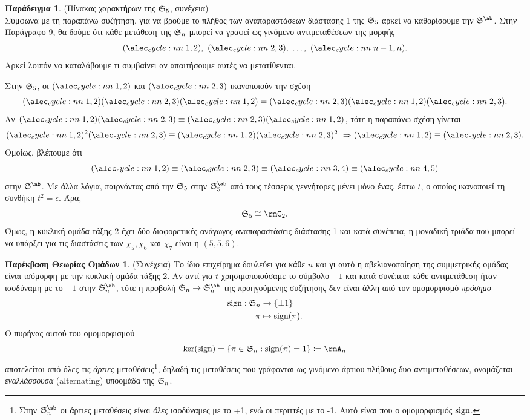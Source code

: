\documentclass[12pt,a4paper,reqno]{amsart}
\theoremstyle{definition}
\newtheorem*{example}{Παράδειγμα}
\newtheorem*{gp_theory}{Παρέκβαση Θεωρίας Ομάδων}
\begin{document}
\begin{example}{\rm(Πίνακας χαρακτήρων της $\mathfrak{S}_5$, συνέχεια)} \\
    Σύμφωνα με τη παραπάνω συζήτηση, για να βρούμε το πλήθος των αναπαραστάσεων διάστασης 1 της $\mathfrak{S}_5$ αρκεί να καθορίσουμε την $\fS^{\ab}$. Στην Παράγραφο 9, θα δούμε ότι κάθε μετάθεση της $\mathfrak{S}_n$ μπορεί να γραφεί ως γινόμενο αντιμεταθέσεων της μορφής 
    \[
    \cycle{1,2}, \ \cycle{2,3}, \ \dots, \ \cycle{n-1,n}.
    \]
    Αρκεί λοιπόν να καταλάβουμε τι συμβαίνει αν απαιτήσουμε αυτές να μετατίθενται. 
    
    Στην $\mathfrak{S}_5$, οι $\cycle{1,2}$ και $\cycle{2,3}$ ικανοποιούν την σχέση
    \[
    \cycle{1,2}\cycle{2,3}\cycle{1,2} = \cycle{2,3}\cycle{1,2}\cycle{2,3}.
    \]
    Αν $\cycle{1,2}\cycle{2,3} \equiv \cycle{2,3}\cycle{1,2}$, τότε η παραπάνω σχέση γίνεται 
    \[
    \cycle{1,2}^2\cycle{2,3} \equiv \cycle{1,2}\cycle{2,3}^2 \ \then \cycle{1,2} \equiv \cycle{2,3}.
    \]
    Ομοίως, βλέπουμε ότι 
    \[
    \cycle{1,2} \equiv \cycle{2,3} \equiv \cycle{3,4} \equiv \cycle{4,5}
    \]
    στην $\fS^\ab$. Με άλλα λόγια, παιρνόντας από την  $\mathfrak{S}_5$ στην $\fS_5^\ab$ από τους τέσσερις γεννήτορες μένει μόνο ένας, έστω $t$, ο οποίος ικανοποιεί τη συνθήκη $t^2 = \epsilon$. Άρα, 
    \[
    \fS_5 \cong \rmC_2.
    \]
    Όμως, η κυκλική ομάδα τάξης 2 έχει δύο διαφορετικές ανάγωγες αναπαραστάσεις διάστασης 1 και κατά συνέπεια, η μοναδική τριάδα που μπορεί να υπάρξει για τις διαστάσεις των $\chi_5, \chi_6$ και $\chi_7$ είναι η $(5,5,6)$.
\end{example}

\begin{gp_theory}{\rm(Συνέχεια)}
Το ίδιο επιχείρημα δουλεύει για κάθε $n$ και γι αυτό η αβελιανοποίηση της συμμετρικής ομάδας είναι ισόμορφη με την κυκλική ομάδα τάξης 2. Αν αντί για $t$ χρησιμοποιού\-σαμε το σύμβολο $-1$ και κατά συνέπεια κάθε αντιμετάθεση ήταν ισοδύναμη με το $-1$ στην $\fS_n^\ab$, τότε η προβολή $\fS_n \to \fS_n^\ab$ της προηγούμενης συζήτησης δεν είναι άλλη από τον ομομορφισμό \emph{πρόσημο}
\begin{align*}
    \mathrm{sign}: \mathfrak{S}_n &\rightarrow \{\pm1\} \\ 
    \pi &\mapsto \mathrm{sign}(\pi).
\end{align*}
Ο πυρήνας αυτού του ομομορφισμού 
\[
\ker(\sign) = \{\pi \in \fS_n : \sign(\pi) = 1\} \coloneqq \rmA_n
\]
αποτελείται από όλες τις \emph{άρτιες} μεταθέσεις\footnote{Στην $\fS_n^\ab$ οι άρτιες μεταθέσεις είναι \emph{όλες} ισοδύναμες με το +1, ενώ οι περιττές με το -1. Αυτό είναι που  ο ομομορφισμός $\mathrm{sign}$.}, δηλαδή τις μεταθέσεις που γράφονται ως γινόμενο άρτιου πλήθους δυο αντιμεταθέσεων, ονομάζεται \emph{εναλλάσσουσα} (alternating) υποομάδα της $\mathfrak{S}_n$. 
\end{gp_theory}
\end{document}
